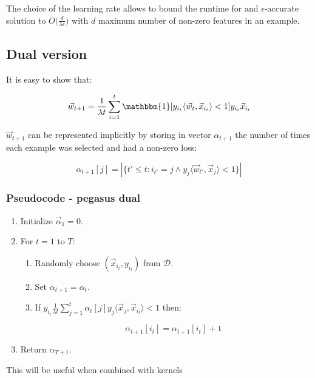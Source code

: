 		The choice of the learning rate allows to bound the runtime for and $\epsilon$-accurate solution to $O\biggl(\frac{d}{\lambda\epsilon}\biggr)$ with $d$ maximum number of non-zero features in an example.

	\subsection{Dual version}
	It is easy to show that:

	$$\vec{w}_{t+1} = \frac{1}{\lambda t}\sum\limits_{i=1}^t\mathbbm{1}[y_{i_t}\langle\vec{w}_t, \vec{x}_{i_t}\rangle < 1]y_{i_t}\vec{x}_{i_t}$$

	$\vec{w}_{t+1}$ can be represented implicitly by storing in vector $\alpha_{t+1}$ the number of times each example was selected and had a non-zero loss:

	$$\alpha_{t+1}[j] = |\{t'\le t:i_{t'} = j\land y_j\langle\vec{w}_{t'},\vec{x}_j\rangle < 1\}|$$

		\subsubsection{Pseudocode - pegasus dual}

		\begin{enumerate}
			\item Initialize $\vec{\alpha}_1 = 0$.
			\item For $t = 1$ to $T$:
				\begin{enumerate}
					\item Randomly choose $(\vec{x}_{i_t}, y_{i_t})$ from $\mathcal{D}$.
					\item Set $\alpha_{t+1} = \alpha_t$.
					\item If $y_{i_t}\frac{1}{\lambda t}\sum\limits_{j=1}^t \alpha_t[j]y_j\langle\vec{x}_j, \vec{x}_{i_t}\rangle < 1$ then:

						$$\alpha_{t+1}[i_t] = \alpha_{t+1}[i_t] + 1$$
				\end{enumerate}
			\item Return $\alpha_{T+1}$.
		\end{enumerate}

		This will be useful when combined with kernels
